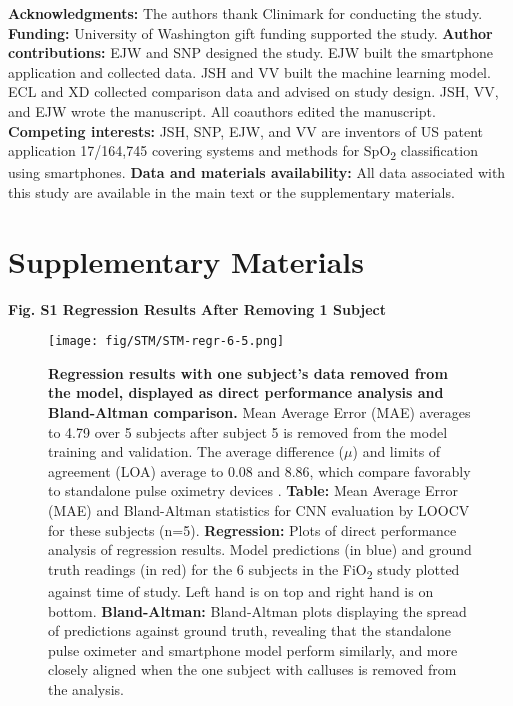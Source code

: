 \documentclass[12pt]{article}
\begin{document}


\smallskip

\textbf{Acknowledgments:}
The authors thank Clinimark for conducting the study.
\textbf{Funding:}
University of Washington gift funding supported the study.
\textbf{Author contributions:}
EJW and SNP designed the study.  EJW built the smartphone application and collected data.  JSH and VV built the machine learning model.  ECL and XD collected comparison data and advised on study design.  JSH, VV, and EJW wrote the manuscript.  All coauthors edited the manuscript.
\textbf{Competing interests:} 
JSH, SNP, EJW, and VV are inventors of US patent application 17/164,745 covering systems and methods for SpO\textsubscript{2} classification using smartphones.
\textbf{Data and materials availability:}
All data associated with this study are available in the main text or the supplementary materials.

\newpage
\section*{Supplementary Materials}

\textbf{Fig. S1 Regression Results After Removing 1 Subject}

\smallskip

\begin{figure}[h]
\texttt{[image: fig/STM/STM-regr-6-5.png]}
\caption{\textbf{Regression results with one subject's data removed from the model, displayed as direct performance analysis and Bland-Altman comparison.} Mean Average Error (MAE) averages to 4.79 over 5 subjects after subject 5 is removed from the model training and validation.  The average difference ($\mu$) and limits of agreement (LOA) average to 0.08 and 8.86, which compare favorably to standalone pulse oximetry devices \cite{kelly2001accurate}. \textbf{Table:} Mean Average Error (MAE) and Bland-Altman statistics for CNN evaluation by LOOCV for these subjects (n=5). \textbf{Regression:} Plots of direct performance analysis of regression results.  Model predictions (in blue) and ground truth readings (in red) for the 6 subjects in the FiO\textsubscript{2} study plotted against time of study.  Left hand is on top and right hand is on bottom. \textbf{Bland-Altman:} Bland-Altman plots displaying the spread of predictions against ground truth, revealing that the standalone pulse oximeter and smartphone model perform similarly, and more closely aligned when the one subject with calluses is removed from the analysis.}
\label{reg-ba-5}
\end{figure}
\end{document}
